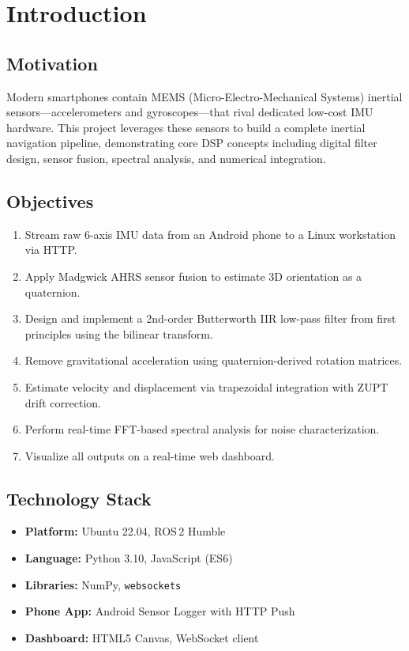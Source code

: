 \documentclass[12pt,a4paper]{article}
\begin{document}
\tableofcontents
\newpage

\section{Introduction}

\subsection{Motivation}
Modern smartphones contain MEMS (Micro-Electro-Mechanical Systems) inertial sensors---accelerometers and gyroscopes---that rival dedicated low-cost IMU hardware. This project leverages these sensors to build a complete inertial navigation pipeline, demonstrating core DSP concepts including digital filter design, sensor fusion, spectral analysis, and numerical integration.

\subsection{Objectives}
\begin{enumerate}
  \item Stream raw 6-axis IMU data from an Android phone to a Linux workstation via HTTP.
  \item Apply Madgwick AHRS sensor fusion to estimate 3D orientation as a quaternion.
  \item Design and implement a 2nd-order Butterworth IIR low-pass filter from first principles using the bilinear transform.
  \item Remove gravitational acceleration using quaternion-derived rotation matrices.
  \item Estimate velocity and displacement via trapezoidal integration with ZUPT drift correction.
  \item Perform real-time FFT-based spectral analysis for noise characterization.
  \item Visualize all outputs on a real-time web dashboard.
\end{enumerate}

\subsection{Technology Stack}
\begin{itemize}
  \item \textbf{Platform:} Ubuntu 22.04, ROS\,2 Humble
  \item \textbf{Language:} Python 3.10, JavaScript (ES6)
  \item \textbf{Libraries:} NumPy, \texttt{websockets}
  \item \textbf{Phone App:} Android Sensor Logger with HTTP Push
  \item \textbf{Dashboard:} HTML5 Canvas, WebSocket client
\end{itemize}
\end{document}
